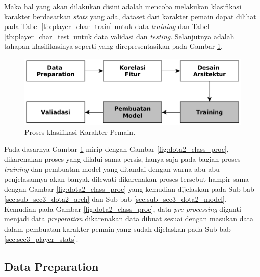 Maka hal yang akan dilakukan disini adalah mencoba melakukan klasifikasi karakter berdasarkan \textit{stats} yang ada, dataset dari karakter pemain dapat dilihat pada Tabel \ref{tb:player_char_train} untuk data \textit{training} dan Tabel \ref{tb:player_char_test} untuk data validasi dan \textit{testing}. Selanjutnya adalah tahapan klasifikasinya seperti yang direpresentasikan pada Gambar \ref{fig:player_class_proc}. 
\vspace{1ex}

\begin{figure} [!h] \centering
	\includegraphics[scale=0.035]{img/player_char_nn_classification.png}
	\caption{Proses klasifikasi Karakter Pemain.}
	\label{fig:player_class_proc}
\end{figure}

Pada dasarnya Gambar \ref{fig:player_class_proc} mirip dengan Gambar \ref{fig:dota2_class_proc}, dikarenakan proses yang dilalui sama persis, hanya saja pada bagian proses \textit{training} dan pembuatan model yang ditandai dengan warna abu-abu penjelasannya akan banyak dilewati dikarenakan proses tersebut hampir sama dengan Gambar \ref{fig:dota2_class_proc} yang kemudian dijelaskan pada Sub-bab \ref{sec:sub_sec3_dota2_arch} dan Sub-bab \ref{sec:sub_sec3_dota2_model}. Kemudian pada Gambar \ref{fig:dota2_class_proc}, data \textit{pre-processing} diganti menjadi data \textit{preparation} dikarenakan data dibuat sesuai dengan masukan data dalam pembuatan karakter pemain yang sudah dijelaskan pada Sub-bab \ref{sec:sec3_player_stats}.
\vspace{1ex}

\subsection{Data Preparation}
\label{sec:sub_sec3_player_data_prep}
\vspace{1ex}

